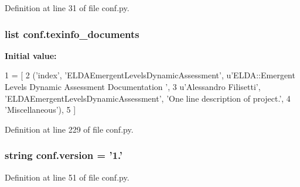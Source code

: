 Definition at line 31 of file conf.\-py.

\hypertarget{a00132_a54b0faed214ac92017d5689efbb10672}{
\subsubsection[{texinfo\-\_\-documents}]{\setlength{\rightskip}{0pt plus 5cm}list conf.\-texinfo\-\_\-documents}}\label{a00132_a54b0faed214ac92017d5689efbb10672}
{\bfseries Initial value\-:}
\begin{DoxyCode}
1 = [
2   (\textcolor{stringliteral}{'index'}, \textcolor{stringliteral}{'ELDAEmergentLevelsDynamicAssessment'}, \textcolor{stringliteral}{u'ELDA::Emergent Levels Dynamic Assessment Documentation
      '},
3    \textcolor{stringliteral}{u'Alessandro Filisetti'}, \textcolor{stringliteral}{'ELDAEmergentLevelsDynamicAssessment'}, \textcolor{stringliteral}{'One line description of project.'},
4    \textcolor{stringliteral}{'Miscellaneous'}),
5 ]
\end{DoxyCode}


Definition at line 229 of file conf.\-py.

\hypertarget{a00132_ade15c5b54093b64d7c428ec19ca5b1cb}{
\subsubsection[{version}]{\setlength{\rightskip}{0pt plus 5cm}string conf.\-version = '1.'}}\label{a00132_ade15c5b54093b64d7c428ec19ca5b1cb}


Definition at line 51 of file conf.\-py.

